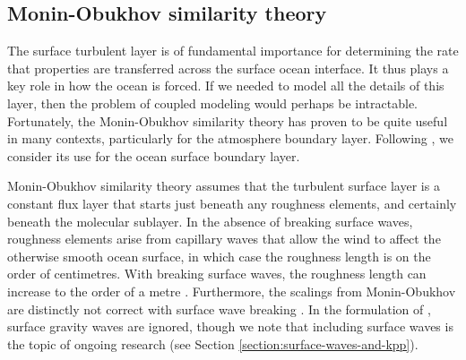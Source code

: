 \subsection{Monin-Obukhov similarity theory}
\label{subsection:m-o-similarity-theory}

The surface turbulent layer is of fundamental importance for
determining the rate that properties are transferred across the
surface ocean interface.  It thus plays a key role in how the ocean is
forced.  If we needed to model all the details of this layer, then the
problem of coupled modeling would perhaps be intractable.
Fortunately, the Monin-Obukhov similarity theory has proven to be
quite useful in many contexts, particularly for the atmosphere
boundary layer.  Following \cite{LargeKPP}, we consider its use for
the ocean surface boundary layer.

Monin-Obukhov similarity theory assumes that the turbulent surface
layer is a constant flux layer that starts just beneath any roughness
elements, and certainly beneath the molecular sublayer.  In the
absence of breaking surface waves, roughness elements arise from
capillary waves that allow the wind to affect the otherwise smooth
ocean surface, in which case the roughness length is on the order of
centimetres.  With breaking surface waves, the roughness length can
increase to the order of a metre \citep[e.g., see concluding section
to][]{Craig_Banner_1994}.  Furthermore, the scalings from
Monin-Obukhov are distinctly not correct with surface wave breaking
\citep[e.g.,][]{Craig_Banner_1994,Terray_etal1996}.  In the
formulation of \cite{LargeKPP}, surface gravity waves are ignored,
though we note that including surface waves is the topic of ongoing
research (see Section \ref{section:surface-waves-and-kpp}).

